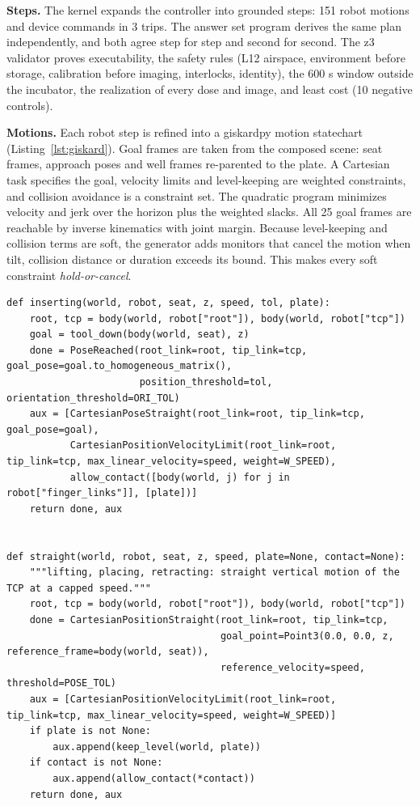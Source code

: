 \documentclass[10pt,a4paper]{article}
\begin{document}
\textbf{Steps.} The kernel expands the controller into grounded steps: 151 robot motions and device commands in 3 trips. The answer set program derives the same plan independently, and both agree step for step and second for second. The z3 validator proves executability, the safety rules (L12 airspace, environment before storage, calibration before imaging, interlocks, identity), the 600 s window outside the incubator, the realization of every dose and image, and least cost (10 negative controls).

\textbf{Motions.} Each robot step is refined into a giskardpy motion statechart (Listing~\ref{lst:giskard}). Goal frames are taken from the composed scene: seat frames, approach poses and well frames re-parented to the plate. A Cartesian task specifies the goal, velocity limits and level-keeping are weighted constraints, and collision avoidance is a constraint set. The quadratic program minimizes velocity and jerk over the horizon plus the weighted slacks. All 25 goal frames are reachable by inverse kinematics with joint margin. Because level-keeping and collision terms are soft, the generator adds monitors that cancel the motion when tilt, collision distance or duration exceeds its bound. This makes every soft constraint \emph{hold-or-cancel}.

\begin{listing}[tbp]
\begin{Verbatim}[fontsize=\footnotesize,breaklines,frame=lines,framesep=2mm]
def inserting(world, robot, seat, z, speed, tol, plate):
    root, tcp = body(world, robot["root"]), body(world, robot["tcp"])
    goal = tool_down(body(world, seat), z)
    done = PoseReached(root_link=root, tip_link=tcp, goal_pose=goal.to_homogeneous_matrix(),
                       position_threshold=tol, orientation_threshold=ORI_TOL)
    aux = [CartesianPoseStraight(root_link=root, tip_link=tcp, goal_pose=goal),
           CartesianPositionVelocityLimit(root_link=root, tip_link=tcp, max_linear_velocity=speed, weight=W_SPEED),
           allow_contact([body(world, j) for j in robot["finger_links"]], [plate])]
    return done, aux


def straight(world, robot, seat, z, speed, plate=None, contact=None):
    """lifting, placing, retracting: straight vertical motion of the TCP at a capped speed."""
    root, tcp = body(world, robot["root"]), body(world, robot["tcp"])
    done = CartesianPositionStraight(root_link=root, tip_link=tcp,
                                     goal_point=Point3(0.0, 0.0, z, reference_frame=body(world, seat)),
                                     reference_velocity=speed, threshold=POSE_TOL)
    aux = [CartesianPositionVelocityLimit(root_link=root, tip_link=tcp, max_linear_velocity=speed, weight=W_SPEED)]
    if plate is not None:
        aux.append(keep_level(world, plate))
    if contact is not None:
        aux.append(allow_contact(*contact))
    return done, aux
\end{Verbatim}
\caption{Generated Giskard phase for inserting the gripper at a seat (excerpt): the end monitor, the straight-line task, the speed limit and the permitted finger contact.}\label{lst:giskard}
\end{listing}
\end{document}
